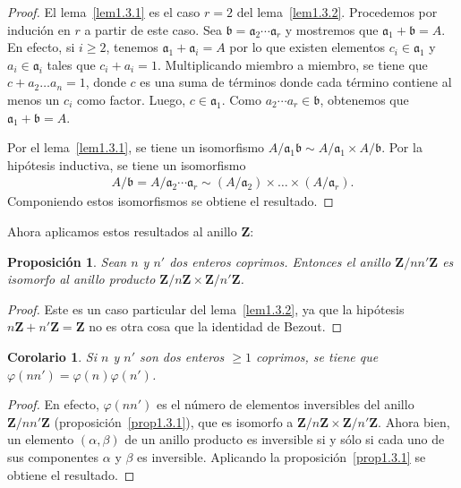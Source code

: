 \documentclass[10pt,oneside,bibtotoc,smallheadings,leqno,a5paper,DIV=12]{scrbook}
\newcommand{\ZZ}{\mathbf{Z}}
\newcommand{\idl}[1]{\mathfrak{#1}}
\newcommand{\QED}{}%
\numberwithin{equation}{section}
\theoremstyle{defi}
\theoremstyle{enonce}
\newtheorem{proposition}{Proposici\'on}
\newtheorem{corollary}{Corolario}
\theoremstyle{rem}
\numberwithin{theorem}{section}
\numberwithin{proposition}{section}
\numberwithin{definition}{section}
\numberwithin{lemma}{section}
\numberwithin{corollary}{section}
\numberwithin{example}{section}
\numberwithin{footnote}{section}%
\begin{document}
\begin{proof}
El lema~\ref{lem1.3.1} es el caso $r=2$ del lema~\ref{lem1.3.2}. Procedemos por induci\'on en $r$ a partir de este
caso. Sea $\idl{b} = \idl{a}_{2}\cdots\idl{a}_{r}$ y mostremos que $\idl{a}_{1}+\idl{b}=A$.
En efecto, si $i\geq 2$, tenemos $\idl{a}_{1}+\idl{a}_{i} = A$ por lo que existen
elementos $c_{i}\in\idl{a}_{1}$ y $a_{i}\in\idl{a}_{i}$ tales que $c_{i}+a_{i} = 1$. Multiplicando
miembro a miembro, se tiene que $c+a_{2}\dots a_{n} = 1$, donde $c$ es una suma de t\'erminos
donde cada t\'ermino contiene al menos un $c_{i}$ como factor. Luego, $c\in\idl{a}_{1}$. Como
$a_{2}\cdots a_{r}\in\idl{b}$, obtenemos que $\idl{a}_{1}+\idl{b} =A$.

Por el lema~\ref{lem1.3.1}, se tiene un isomorfismo
$A/\idl{a}_{1}\idl{b}\sim A/\idl{a}_{1}\times A/\idl{b}$.
Por la hip\'otesis inductiva, se tiene un isomorfismo
\begin{gather*}
A/\idl{b} = A/\idl{a}_{2}\cdots\idl{a}_{r}\sim (A/\idl{a}_{2})\times\dots\times(A/\idl{a}_{r}).
\end{gather*}
Componiendo estos isomorfismos se obtiene el resultado. \QED
\end{proof}

Ahora aplicamos estos resultados al anillo $\ZZ$:

\begin{proposition}
Sean $n$ y $n'$ dos enteros coprimos. Entonces el anillo $\ZZ/nn'\ZZ$ es isomorfo al anillo
producto $\ZZ/n\ZZ\times\ZZ/n'\ZZ$.
\end{proposition}

\begin{proof}
Este es un caso particular del lema~\ref{lem1.3.2}, ya que la hip\'otesis $n\ZZ+n'\ZZ=\ZZ$
no es otra cosa que la identidad de Bezout.
\end{proof}

\begin{corollary}\label{coro1.3.1}
Si $n$ y $n'$ son dos enteros $\geq 1$ coprimos, se tiene que
$\varphi(nn') = \varphi(n)\varphi(n')$.
\end{corollary}

\begin{proof}
En efecto, $\varphi(nn')$ es el n\'umero de elementos inversibles del anillo $\ZZ/nn'\ZZ$
(proposici\'on~\ref{prop1.3.1}), que es isomorfo a $\ZZ/n\ZZ\times\ZZ/n'\ZZ$. Ahora
bien, un elemento
$(\alpha,\beta)$ de un anillo producto es inversible si y s\'olo si cada uno de sus componentes
$\alpha$ y $\beta$ es inversible. Aplicando la proposici\'on~\ref{prop1.3.1} se
obtiene el resultado.
\end{proof}
\end{document}

